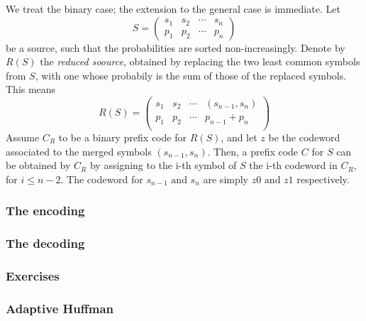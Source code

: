 \documentclass{subfiles}
\begin{document}
    We treat the binary case; the extension to the general case is immediate.
    Let 
    \[
        S = \begin{pmatrix}
            s_{1} & s_{2} & \cdots & s_{n} \\ 
            p_{1} & p_{2} & \cdots & p_{n} 
        \end{pmatrix}
    \]
    be a source, such that the probabilities are sorted non-increasingly.
    Denote by \(R(S)\) the \emph{reduced soource}, 
        obtained by replacing the two least common symbols from \(S\),
        with one whose probabily is the sum of those of the replaced symbols.
        This means 
        \[
            R(S) = \begin{pmatrix}
                s_{1} & s_{2} & \cdots & (s_{n - 1}, s_{n}) \\ 
                p_{1} & p_{2} & \cdots & p_{n - 1} + p_{n} \\
            \end{pmatrix}
        \]
    Assume \(C_{R}\) to be a binary prefix code for \(R(S)\),
        and let \(z\) be the codeword associated to the merged symbols \((s_{n - 1}, s_{n})\).
    Then, a prefix code \(C\) for \(S\) can be obtained by \(C_{R}\) by assigning 
        to the i-th symbol of \(S\) the i-th codeword in \(C_{R}\),
        for \(i \le n - 2\). 
        The codeword for \(s_{n - 1} \text{ and } s_{n}\) are simply 
        \(z0 \text{ and } z1\) respectively.

    \clearpage 
    \subsubsection{The encoding}
    

    \subsubsection{The decoding}
    

    \subsubsection{Exercises}
    

    \subsubsection{Adaptive Huffman}
    
\end{document}
